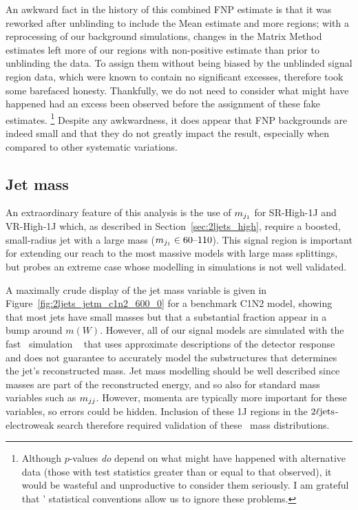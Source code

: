 An awkward fact in the history of this combined FNP estimate is that it
was reworked after unblinding to include the Mean estimate and more regions;
with a reprocessing of our background simulations, changes in the Matrix Method
estimates left more of our regions with non-positive estimate than prior to
unblinding the data.
To assign them without being biased by the unblinded signal region data,
which were known to contain no significant excesses, therefore took some
barefaced honesty.
Thankfully, we do not need to consider what might have happened had an excess
been observed before the assignment of these fake estimates.%
\footnote{%
Although $p$-values \emph{do} depend on what might have happened with
alternative data
(those with test statistics greater than or equal to that observed),
it would be wasteful and unproductive to consider them seriously.
I am grateful that \atlas' statistical conventions allow us to ignore these
problems.
}
Despite any awkwardness, it does appear that FNP backgrounds are indeed
small and that they do not greatly impact the result, especially when compared
to other systematic variations.


\subsection{Jet mass}
\label{sec:2ljets_jet_mass}
An extraordinary feature of this analysis is the use of $m_{j_1}$ for
SR-High-1J and VR-High-1J which, as described in Section~\ref{sec:2ljets_high},
require a boosted, small-radius jet with a large mass
($m_{j_1} \in 60\textrm{--}110$).
This signal region is important for extending our reach to the most massive
models with large mass splittings, but probes an extreme case whose modelling
in simulations is not well validated.

A maximally crude display of the jet mass variable is given in
Figure~\ref{fig:2ljets_jetm_c1n2_600_0} for a benchmark C1N2 model, showing
that most  jets have small masses but that a substantial fraction appear in a
bump around $m(W)$.
However, all of our signal models are simulated with the fast \atlas\ simulation
\afii\ \cite{SOFT-2010-01} that uses approximate descriptions of the
detector response and does not guarantee to accurately model the substructures
that determines the jet's reconstructed mass.
Jet mass modelling should be well described since masses are part of the
reconstructed energy, and so also for standard mass variables such as $m_{jj}$.
However, momenta are typically more important for these variables, so
errors could be hidden.
Inclusion of these 1J regions in the $2\ell\mathrm{jets}$-electroweak search therefore
required validation of these \afii\ mass distributions.

